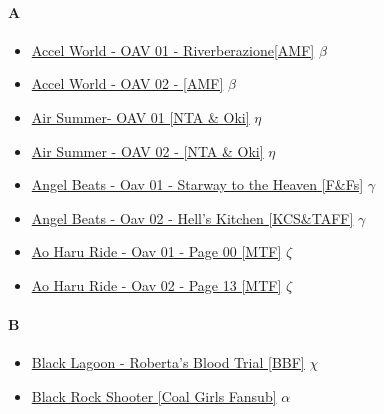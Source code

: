 		\paragraph{A} \hypertarget{OA}{}
			\begin{itemize}
				\item \href{https://mega.nz/#!n8JFiIwI!Vl8cz8o5XK1SDiS2gzKbugfLTAt3qPdHDudG6VTz9A0} {Accel World - OAV 01 - Riverberazione[AMF]}  $\beta$  \\ 
				\item \href{https://mega.nz/#!3pYG3JpB!h4PPWiblJ0l0oYsjfb1x1MTXIaVUYc0tgHeqKDMFUgk} {Accel World - OAV 02 - [AMF]}  $\beta$  \\ 
				\item \href{https://mega.nz/#!3pYG3JpB!h4PPWiblJ0l0oYsjfb1x1MTXIaVUYc0tgHeqKDMFUgk} {Air Summer- OAV 01 [NTA \& Oki]}  $\eta$  \\ 
				\item \href{https://mega.nz/#!3pYG3JpB!h4PPWiblJ0l0oYsjfb1x1MTXIaVUYc0tgHeqKDMFUgk} {Air Summer - OAV 02 - [NTA \& Oki]}  $\eta$  \\ 
				\item \href{https://mega.nz/#!x45G2IaZ!kuBLw7FqV4edsxykcu-muZthIT6Zw8m7Evh665QAb3g} {Angel Beats - Oav 01 - Starway to the Heaven [F\&Fs]}  $\gamma$ \\ 
				\item \href{https://mega.nz/#!k0wmxIQY!Bx8Agx_FdiphE3dqVQmxAY0qERcVw2hwuIQieS8Lijo} {Angel Beats - Oav 02 - Hell's Kitchen [KCS\&TAFF]} $\gamma$  \\ 
				\item \href{https://mega.nz/#!W40VHSAT!sriEyY-JZZ7GLEuyH8YPtN4NbfS8zG4GPvKpQaX7PHo} {Ao Haru Ride - Oav 01 - Page 00 [MTF]} $\zeta$  \\ 
				\item \href{https://mega.nz/#!601lSAiJ!_AOKejqGsfeNmq6f1NBJuRZGQbFB7vG05AA_zHgnguE} {Ao Haru Ride - Oav 02 - Page 13 [MTF]} $\zeta$  \\ 
		
			\end{itemize}
			
		\paragraph{B} \hypertarget{OB}{}
			\begin{itemize}
				
				\item \href{https://mega.nz/#F!WodSzJZB!Q321W69srY0JdriWwnvy8w} {Black Lagoon - Roberta's Blood Trial [BBF]}  $\chi$ \\
				\item \href{https://mega.nz/#!YJFwjBDQ!nQmJZRGThExreULbIINiy12U0sSA2XbURFQAhj3yA7Y} {Black Rock Shooter [Coal Girls Fansub]}  $\alpha$ \\ 
		
			
			\end{itemize}	
			
